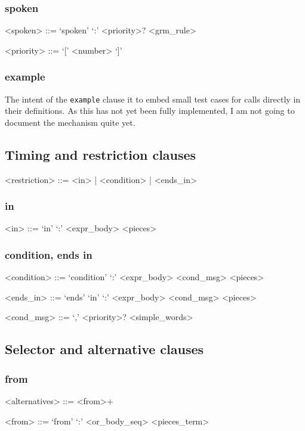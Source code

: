 \documentclass[12pt]{article}
\newcommand{\clause}[1]{\texttt{#1}}
\begin{document}
\subsubsection{spoken}
\begin{grammar}
<spoken> ::= `spoken' `:' <priority>? <grm_rule>

<priority> ::= `[' <number> `]'
\end{grammar}

\subsubsection{example}
The intent of the \clause{example} clause it to embed small test cases
for calls directly in their definitions.  As this has not yet been
fully implemented, I am not going to document the mechanism
quite yet.

\subsection{Timing and restriction clauses}
\begin{grammar}
<restriction> ::= <in> | <condition> | <ends_in>
\end{grammar}

\subsubsection{in}\label{sec:in}
\begin{grammar}
<in> ::= `in' `:' <expr_body> <pieces>
\end{grammar}

\subsubsection{condition, ends in}
\begin{grammar}
<condition> ::= `condition' `:' <expr_body> <cond_msg> <pieces>

<ends_in> ::= `ends' `in' `:' <expr_body> <cond_msg> <pieces>

<cond_msg> ::= `,' <priority>? <simple_words>
\end{grammar}

\subsection{Selector and alternative clauses}
\subsubsection{from}
\begin{grammar}
<alternatives> ::= <from>+

<from> ::= `from' `:' <or_body_seq> <pieces_term>
\end{grammar}
\end{document}
